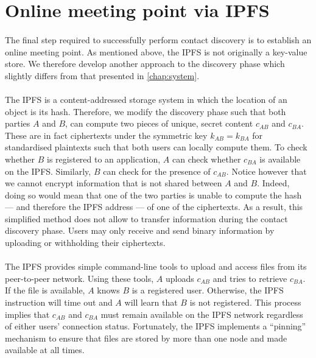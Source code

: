 \section{Online meeting point via IPFS}

	\paragraph{} The final step required to successfully perform contact discovery is to establish an online meeting point. As mentioned above, the IPFS is not originally a key-value store. We therefore develop another approach to the discovery phase which slightly differs from that presented in \autoref{chap:system}.
	
	\paragraph{} The IPFS is a content-addressed storage system in which the location of an object is its hash. Therefore, we modify the discovery phase such that both parties $A$ and $B$, can compute two pieces of unique, secret content $c_{AB}$ and $c_{BA}$. These are in fact ciphertexts under the symmetric key $k_{AB} = k_{BA}$ for standardised plaintexts such that both users can locally compute them. To check whether $B$ is registered to an application, $A$ can check whether $c_{BA}$ is available on the IPFS. Similarly, $B$ can check for the presence of $c_{AB}$. Notice however that we cannot encrypt information that is not shared between $A$ and $B$. Indeed, doing so would mean that one of the two parties is unable to compute the hash --- and therefore the IPFS address --- of one of the ciphertexts. As a result, this simplified method does not allow to transfer information during the contact discovery phase. Users may only receive and send binary information by uploading or withholding their ciphertexts.
	
	\paragraph{} The IPFS provides simple command-line tools to upload and access files from its peer-to-peer network. Using these tools, $A$ uploads $c_{AB}$ and tries to retrieve $c_{BA}$. If the file is available, $A$ knows $B$ is a registered user. Otherwise, the IPFS instruction will time out and $A$ will learn that $B$ is not registered. This process implies that $c_{AB}$ and $c_{BA}$ must remain available on the IPFS network regardless of either users' connection status. Fortunately, the IPFS implements a ``pinning'' mechanism to ensure that files are stored by more than one node and made available at all times.


